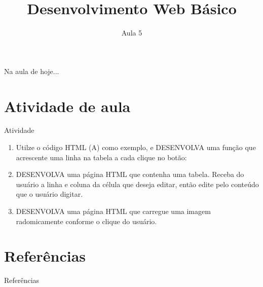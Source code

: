 \documentclass{beamer}
\title{Desenvolvimento Web Básico}
\subtitle{Aula 5}
\begin{document}
\frame{
 \titlepage
}

\begin{frame}{Na aula de hoje...} 
\tableofcontents 
\end{frame}
\section{Atividade de aula}
\begin{frame}{Atividade}
  \begin{enumerate}
      \item Utilze o código HTML (A) como exemplo, e DESENVOLVA uma função que acrescente uma linha na tabela a cada clique no botão:
    \item DESENVOLVA uma página HTML que contenha uma tabela. Receba do usuário a linha e coluna da célula que deseja editar, então edite pelo conteúdo que o usuário digitar.
    \item DESENVOLVA uma página HTML que carregue uma imagem radomicamente conforme o clique do usuário. 
  \end{enumerate}


\end{frame}
\section{Referências}

\begin{frame}{Referências}%
\small
\begin{center}
\tiny


\end{center}
\end{frame}
\end{document}
